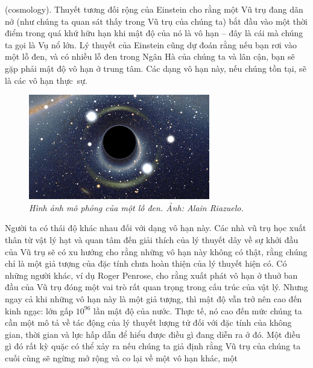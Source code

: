 \begin{multicols}{2}
	(cosmology). Thuyết tương đối rộng của Einstein cho rằng một Vũ trụ đang dãn
	nở (như chúng ta quan sát thấy trong Vũ trụ của chúng ta) bắt đầu vào một thời điểm
	trong quá khứ hữu hạn khi mật độ của nó là vô hạn -- đây là cái mà chúng ta
	gọi là Vụ nổ lớn. Lý thuyết của Einstein cũng dự đoán rằng nếu bạn rơi vào một
	lỗ đen, và có nhiều lỗ đen trong Ngân Hà của chúng ta và lân cận, bạn sẽ gặp
	phải mật độ vô hạn ở trung tâm. Các dạng vô hạn này, nếu chúng tồn tại, sẽ là
	các vô hạn thực~sự.
	\begin{figure}[H]
		\centering
		\vspace*{-5pt}
		\captionsetup{labelformat= empty, justification=centering}
		\includegraphics[width=1\linewidth]{2}
		\caption{\small\textit{\color{quantoan}Hình ảnh mô phỏng của một lỗ đen. Ảnh: Alain Riazuelo.}}
		\vspace*{-10pt}
	\end{figure}
	Người ta có thái độ khác nhau đối với dạng vô hạn này. Các nhà vũ trụ học xuất
	thân từ vật lý hạt và quan tâm đến giải thích của lý thuyết dây về sự khởi đầu của Vũ
	trụ sẽ có xu hướng cho rằng những vô hạn này không có thật, rằng chúng chỉ là
	một giả tượng của đặc tính chưa hoàn thiện của lý thuyết hiện có. Có những người
	khác, ví dụ Roger Penrose, cho rằng xuất phát vô hạn ở thuở ban đầu của Vũ trụ
	đóng một vai trò rất quan trọng trong cấu trúc của vật lý. Nhưng ngay cả khi
	những vô hạn này là một giả tượng, thì mật độ vẫn trở nên cao đến kinh ngạc: lớn
	gấp $10^{96}$ lần mật độ của nước. Thực tế, nó cao
	đến mức chúng ta cần một mô tả về tác động của lý thuyết lượng tử đối với đặc
	tính của không gian, thời gian và lực hấp dẫn để hiểu được điều gì đang diễn
	ra ở đó.
	\vskip 0.05cm
	Một điều gì đó rất kỳ quặc có thể xảy ra nếu chúng ta giả định rằng Vũ trụ của
	chúng ta cuối cùng sẽ ngừng mở rộng và co lại về một vô hạn khác, một

\end{multicols}
